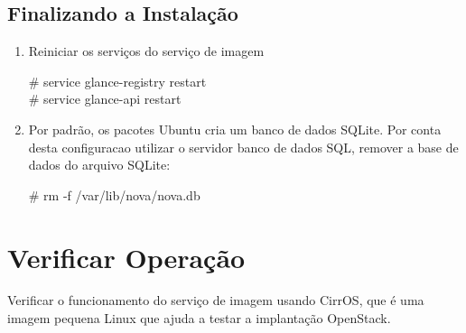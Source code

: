 	\subsection{Finalizando a Instalação}
		\begin{enumerate}
			\item Reiniciar os serviços do serviço de imagem
				\begin{snugshade}
					\# service glance-registry restart \\
					\# service glance-api restart \\
				\end{snugshade}
				
			\item Por padrão, os pacotes Ubuntu cria um banco de dados SQLite. 
			Por conta desta configuracao utilizar o servidor banco de dados SQL, remover a base de dados do arquivo SQLite:
			\begin{snugshade}
				\# rm -f /var/lib/nova/nova.db
			\end{snugshade}		
		\end{enumerate}
		
\section{Verificar Operação}

Verificar o funcionamento do serviço de imagem usando CirrOS, que é uma imagem pequena Linux que ajuda a testar a implantação OpenStack.

